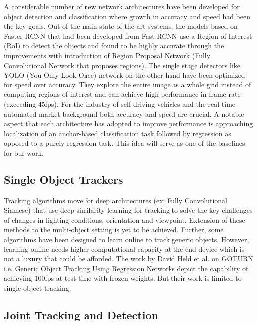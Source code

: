 A considerable number of new network architectures have been developed for object detection and classification where growth in accuracy and speed had been the key goals. Out of the main state-of-the-art systems, the models based on Faster-RCNN \cite{DeepSiam:FasterRCNN} that had been developed from Fast RCNN \cite{DeepSiam:FastRCNN} use a Region of Interest (RoI) to detect the objects and found to be highly accurate through the improvements with introduction of Region Proposal Network (Fully Convolutional Network that proposes regions). The single stage detectors like YOLO \cite{DeepSiam:YOLO} (You Only Look Once) network on the other hand have been optimized for speed over accuracy. They explore the entire image as a whole grid instead of computing regions of interest and can achieve high performance in frame rate (exceeding 45fps). For the industry of self driving vehicles and the real-time automated market background both accuracy and speed are crucial. A notable aspect that each architecture has adopted to improve performance is approaching localization of an anchor-based classification task followed by regression as opposed to a purely regression task. This idea will serve as one of the baselines for our work.

\subsection{Single Object Trackers}

Tracking algorithms move for deep architectures (ex: Fully Convolutional Siamese) that use deep similarity learning for tracking \cite{DeepSiam:SiamFC, DeepSiam:siammask} to solve the key challenges of changes in lighting conditions, orientation and viewpoint. Extension of these methods to the multi-object setting is yet to be achieved. Further, some algorithms have been designed to learn online to track generic objects. However, learning online needs higher computational capacity at the end device which is not a luxury that could be afforded. The work by David Held et al. on GOTURN i.e. Generic Object Tracking Using Regression Networks \cite{DeepSiam:100fps} depict the capability of achieving 100fps at test time with frozen weights. But their work is limited to single object tracking.

\subsection{Joint Tracking and Detection}

